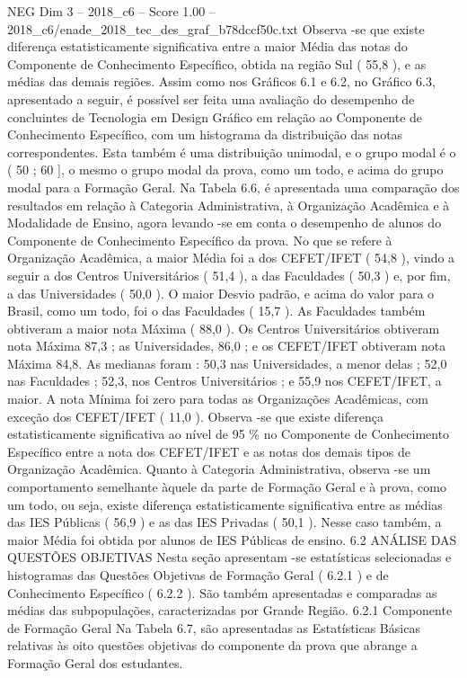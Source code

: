 \begin{textsample}{NEG Dim 3 – 2018\_c6 – Score 1.00 – 2018\_c6/enade\_2018\_tec\_des\_graf\_b78dccf50c.txt}
Observa -se que existe diferença estatisticamente significativa entre a maior Média das notas do Componente de Conhecimento Específico, obtida na região Sul ( 55,8 ), e as médias das demais regiões.
Assim como nos Gráficos 6.1 e 6.2, no Gráfico 6.3, apresentado a seguir, é possível ser feita uma avaliação do desempenho de concluintes de Tecnologia em Design Gráfico em relação ao Componente de Conhecimento Específico, com um histograma da distribuição das notas correspondentes.
Esta também é uma distribuição unimodal, e o grupo modal é o ( 50 ; 60 ], o mesmo o grupo modal da prova, como um todo, e acima do grupo modal para a Formação Geral.
Na Tabela 6.6, é apresentada uma comparação dos resultados em relação à Categoria Administrativa, à Organização Acadêmica e à Modalidade de Ensino, agora levando -se em conta o desempenho de alunos do Componente de Conhecimento Específico da prova.
No que se refere à Organização Acadêmica, a maior Média foi a dos CEFET/IFET ( 54,8 ), vindo a seguir a dos Centros Universitários ( 51,4 ), a das Faculdades ( 50,3 ) e, por fim, a das Universidades ( 50,0 ).
O maior Desvio padrão, e acima do valor para o Brasil, como um todo, foi o das Faculdades ( 15,7 ).
As Faculdades também obtiveram a maior nota Máxima ( 88,0 ).
Os Centros Universitários obtiveram nota Máxima 87,3 ; as Universidades, 86,0 ; e os CEFET/IFET obtiveram nota Máxima 84,8.
As medianas foram : 50,3 nas Universidades, a menor delas ; 52,0 nas Faculdades ; 52,3, nos Centros Universitários ; e 55,9 nos CEFET/IFET, a maior.
A nota Mínima foi zero para todas as Organizações Acadêmicas, com exceção dos CEFET/IFET ( 11,0 ).
Observa -se que existe diferença estatisticamente significativa ao nível de 95 \% no Componente de Conhecimento Específico entre a nota dos CEFET/IFET e as notas dos demais tipos de Organização Acadêmica.
Quanto à Categoria Administrativa, observa -se um comportamento semelhante àquele da parte de Formação Geral e à prova, como um todo, ou seja, existe diferença estatisticamente significativa entre as médias das IES Públicas ( 56,9 ) e as das IES Privadas ( 50,1 ).
Nesse caso também, a maior Média foi obtida por alunos de IES Públicas de ensino. 6.2 ANÁLISE DAS QUESTÕES OBJETIVAS Nesta seção apresentam -se estatísticas selecionadas e histogramas das Questões Objetivas de Formação Geral ( 6.2.1 ) e de Conhecimento Específico ( 6.2.2 ).
São também apresentadas e comparadas as médias das subpopulações, caracterizadas por Grande Região. 6.2.1 Componente de Formação Geral Na Tabela 6.7, são apresentadas as Estatísticas Básicas relativas às oito questões objetivas do componente da prova que abrange a Formação Geral dos estudantes.

\end{textsample}
